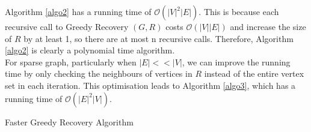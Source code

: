 Algorithm \ref{algo2} has a running time of $\mathcal{O}(|V|^2|E|).$ This is because each recursive call to Greedy Recovery $(G, R)$ costs $\mathcal{O}(|V||E|)$ and increase the size of $R$ by at least 1, so there are at most n recursive calls. Therefore, Algorithm \ref{algo2} is clearly a polynomial time algorithm. \\
For sparse graph, particularly when $|E|<<|V|$, we can improve the running time by only checking the neighbours of vertices in $R$ instead of the entire vertex set in each iteration. This optimisation leads to Algorithm \ref{algo3}, which has a running time of $\mathcal{O}(|E|^2|V|).$\\
\begin{algorithm}[H]\label{algo3}
\caption{Faster Greedy Recovery Algorithm}
\DontPrintSemicolon %
\BlankLine
\end{algorithm}

